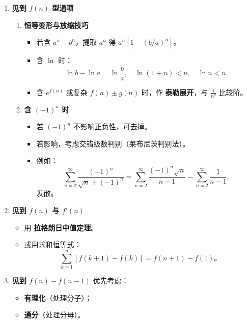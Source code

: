 \begin{enumerate}
    \item \textbf{见到 $f(n)$ 型通项}

          \begin{enumerate}
              \item \textbf{恒等变形与放缩技巧}
                    \begin{itemize}
                        \item 若含 $a^n - b^n$，提取 $a^n$ 得 $a^n[1 - (b/a)^n]$。
                        \item 含 $\ln$ 时：
                              \[
                                  \ln b - \ln a = \ln\frac{b}{a}, \quad
                                  \ln(1+n) < n, \quad \ln n < n.
                              \]
                        \item 含 $e^{f(n)}$ 或复杂 $f(n)\pm g(n)$ 时，作 \textbf{泰勒展开}，与 $\frac{1}{n^p}$ 比较阶。
                    \end{itemize}

              \item \textbf{含 $(-1)^n$ 时}
                    \begin{itemize}
                        \item 若 $(-1)^n$ 不影响正负性，可去掉。
                        \item 若影响，考虑交错级数判别（莱布尼茨判别法）。
                        \item 例如：
                              \[
                                  \sum_{n=2}^{\infty}\frac{(-1)^n}{\sqrt{n}+(-1)^n}
                                  =\sum_{n=2}^{\infty}\frac{(-1)^n\sqrt{n}}{n-1}-\sum_{n=2}^{\infty}\frac{1}{n-1},
                              \]
                              发散。
                    \end{itemize}
          \end{enumerate}

    \item \textbf{见到 $f(n)$ 与 $f'(n)$}
          \begin{itemize}
              \item 用 \textbf{拉格朗日中值定理}。
              \item 或用求和恒等式：
                    \[
                        \sum_{k=1}^{n} [f(k+1)-f(k)] = f(n+1)-f(1)。
                    \]
          \end{itemize}

    \item \textbf{见到 $f(n)-f(n-1)$}
          优先考虑：
          \begin{itemize}
              \item \textbf{有理化}（处理分子）；
              \item \textbf{通分}（处理分母）。
          \end{itemize}


\end{enumerate}
